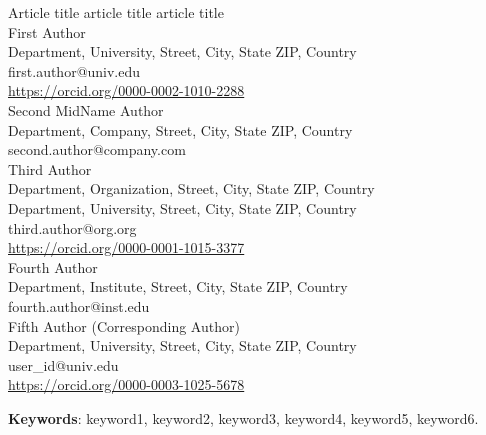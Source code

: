\documentclass[12pt,a4paper]{article}
\date{}  %
\begin{document}


\begin{center}
{\Huge Article title article title article title}
\\[5ex]

{\large First Author} \\
{\small
Department, University, Street, City, State ZIP, Country \\
first.author@univ.edu \\
\url{https://orcid.org/0000-0002-1010-2288}
} \\[1.2em]

{\large Second MidName Author} \\
{\small
Department, Company, Street, City, State ZIP, Country \\
second.author@company.com
} \\[1.2em]

{\large Third Author} \\
{\small
Department, Organization, Street, City, State ZIP, Country \\
Department, University, Street, City, State ZIP, Country \\
third.author@org.org \\
\url{https://orcid.org/0000-0001-1015-3377}
} \\[1.2em]

{\large Fourth Author} \\
{\small
Department, Institute, Street, City, State ZIP, Country \\
fourth.author@inst.edu
} \\[1.2em]

{\large Fifth Author \small(Corresponding Author)} \\
{\small
Department, University, Street, City, State ZIP, Country \\
user\_id@univ.edu \\
\url{https://orcid.org/0000-0003-1025-5678}
}
\end{center}

\begin{abstract}
Abstracts must be able to stand alone and so cannot contain citations to the paper’s references, equations, etc. An abstract must consist of a single paragraph and be concise. Because of online formatting, abstracts must appear as plain as possible. Three to six keywords must be included. Each keyword should not exceed three words. %
\end{abstract}

\textbf{Keywords}: keyword1, keyword2, keyword3, keyword4, keyword5, keyword6.  
\end{document}

